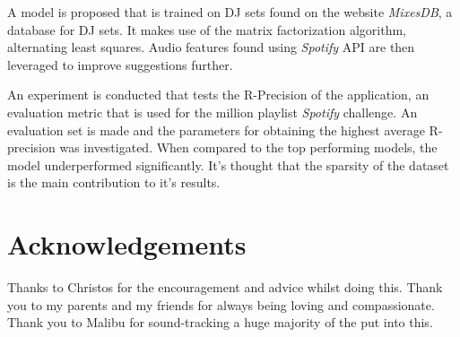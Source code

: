 A model is proposed that is trained on DJ sets found on the website \textit{MixesDB}, a database for DJ sets. It makes use of the matrix factorization algorithm, alternating least squares. Audio features found using \textit{Spotify} API are then leveraged to improve suggestions further. 

An experiment is conducted that tests the R-Precision of the application, an evaluation metric that is used for the million playlist \textit{Spotify} challenge. An evaluation set is made and the parameters for obtaining the highest average R-precision was investigated. When compared to the top performing models, the model underperformed significantly. It's thought that the sparsity of the dataset is the main contribution to it's results.  

\frontmatter

\singlespacing

\setlength{\parskip}{0ex} %

\clearpage
{}
\tableofcontents
\clearpage
{}
{}
\listoffigures
\clearpage
{}
{}


\setlength{\parskip}{1ex plus 0.2ex minus 0.2ex} %

\onehalfspacing

\chapter{Acknowledgements}

Thanks to Christos for the encouragement and advice whilst doing this. Thank you to my parents and my friends for always being loving and compassionate. Thank you to Malibu for sound-tracking a huge majority of the put into this.